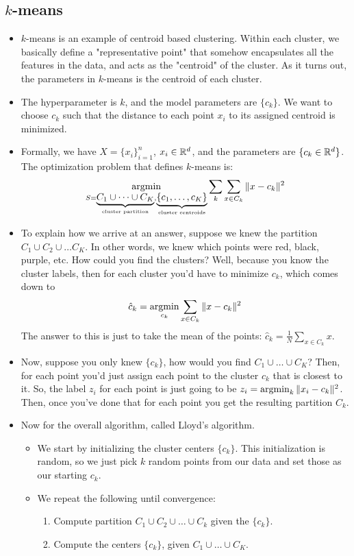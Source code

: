 \subsection{\( k \)-means}
\begin{itemize}
	\item \( k \)-means is an example of centroid based clustering. Within each cluster, we basically define
		a "representative point" that somehow encapsulates all the features in the data, and acts as the
		"centroid" of the cluster. As it turns out, the parameters in \( k \)-means is the centroid of each
		cluster.  
	\item The hyperparameter is \( k \), and the model parameters are \( \{c_k\} \). We want to choose \(
		c_k \) such that the distance to each point \( x_i \) to its assigned centroid is minimized.   
	\item Formally, we have \( X = \{x_i\}_{i = 1}^{n} \), \( x_i \in \mathbb R^{d} \), and the parameters are \(\{
		c_k \in \mathbb R^{d}\} \). The optimization problem that defines \( k \)-means is:
		\[
			\operatorname*{argmin}_{S = \underbrace{C_1 \cup \dots \cup C_K}_{\text{cluster partition}}, \underbrace{\{c_1,
			\dots, c_K \}}_{\text{cluster centroids}}} \sum_{k} \sum_{x \in C_k}\| x -
			c_k\|^2
		\]
	\item To explain how we arrive at an answer, suppose we knew the partition \( C_1 \cup C_2 \cup \dots C_K
		\). In other words, we knew which points were red, black, purple, etc. How could you find the
		clusters? Well, because you know the cluster labels, then for each cluster you'd have to minimize \(
		c_k\), which comes down to
		\[
			\hat{c}_k = \operatorname*{argmin}_{c_k} \sum_{x \in C_k} \|x - c_k\|^2
		\]
		The answer to this is just to take the mean of the points: \( \hat{c}_k = \frac{1}{N}\sum_{x \in
		C_k}x \). 
	\item Now, suppose you only knew \( \{c_k\} \), how would you find \( C_1 \cup \dots \cup C_K \)? Then,
		for each point you'd just assign each point to the cluster \( c_k \) that is closest to it. So, the
		label \( z_i \) for each point is just going to be \( z_i = \operatorname*{argmin}_k \|x_i - c_k\|^2 \). Then, once
		you've done that for each point you get the resulting partition \( C_k \). 
	\item Now for the overall algorithm, called Lloyd's algorithm. 
		\begin{itemize}
			\item We start by initializing the cluster centers \( \{c_k\} \). This initialization is random,
				so we just pick \( k \) random points from our data and set those as our starting \( c_k \).  
			\item We repeat the following until convergence:  
				\begin{enumerate}[label=\roman*.]
					\item Compute partition \( C_1 \cup C_2 \cup \dots \cup C_k \) given the \( \{c_k\} \). 
					\item Compute the centers \( \{c_k\} \), given \( C_1 \cup \dots \cup C_K \). 
				\end{enumerate}
		\end{itemize}
	

\end{itemize}
